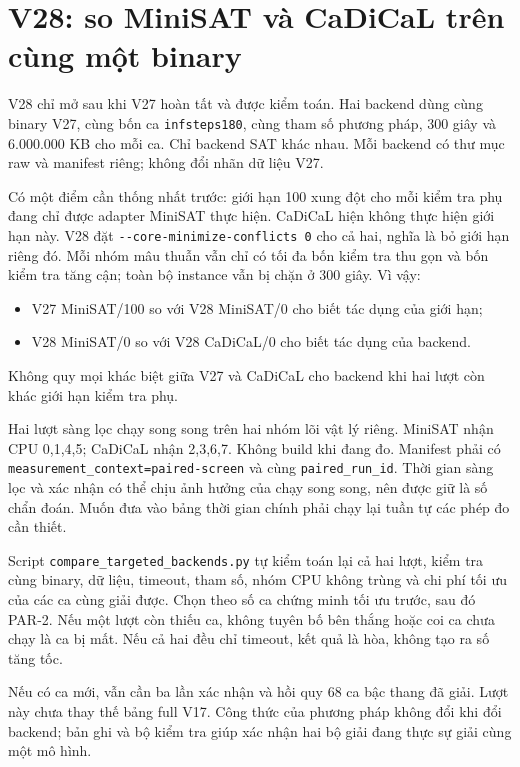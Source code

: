 \documentclass[11pt,a4paper]{article}
\newcommand{\code}[1]{\texttt{#1}}
\newcommand{\file}[1]{\nolinkurl{#1}}
\begin{document}
\section{V28: so MiniSAT và CaDiCaL trên cùng một binary}

V28 chỉ mở sau khi V27 hoàn tất và được kiểm toán. Hai backend dùng
cùng binary V27, cùng bốn ca \code{infsteps180}, cùng tham số phương
pháp, 300 giây và 6.000.000 KB cho mỗi ca. Chỉ backend SAT khác nhau.
Mỗi backend có thư mục raw và manifest riêng; không đổi nhãn dữ liệu V27.

Có một điểm cần thống nhất trước: giới hạn 100 xung đột cho mỗi kiểm tra
phụ đang chỉ được adapter MiniSAT thực hiện. CaDiCaL hiện không thực
hiện giới hạn này. V28 đặt \file{--core-minimize-conflicts 0} cho cả hai,
nghĩa là bỏ giới hạn riêng đó. Mỗi nhóm mâu thuẫn vẫn chỉ có tối đa bốn
kiểm tra thu gọn và bốn kiểm tra tăng cận; toàn bộ instance vẫn bị chặn
ở 300 giây. Vì vậy:
\begin{itemize}
\item V27 MiniSAT/100 so với V28 MiniSAT/0 cho biết tác dụng của giới hạn;
\item V28 MiniSAT/0 so với V28 CaDiCaL/0 cho biết tác dụng của backend.
\end{itemize}
Không quy mọi khác biệt giữa V27 và CaDiCaL cho backend khi hai lượt
còn khác giới hạn kiểm tra phụ.

Hai lượt sàng lọc chạy song song trên hai nhóm lõi vật lý riêng. MiniSAT
nhận CPU 0,1,4,5; CaDiCaL nhận 2,3,6,7. Không build khi đang đo. Manifest
phải có \file{measurement_context=paired-screen} và cùng
\file{paired_run_id}. Thời gian sàng lọc và xác nhận có thể chịu ảnh hưởng
của chạy song song, nên được giữ là số chẩn đoán. Muốn đưa vào bảng thời
gian chính phải chạy lại tuần tự các phép đo cần thiết.

Script \file{compare_targeted_backends.py} tự kiểm toán lại cả hai lượt,
kiểm tra cùng binary, dữ liệu, timeout, tham số, nhóm CPU không trùng
và chi phí tối ưu của các ca cùng giải được. Chọn theo số ca chứng minh
tối ưu trước, sau đó PAR-2. Nếu một lượt còn thiếu ca, không tuyên bố bên
thắng hoặc coi ca chưa chạy là ca bị mất. Nếu cả hai đều chỉ timeout,
kết quả là hòa, không tạo ra số tăng tốc.

Nếu có ca mới, vẫn cần ba lần xác nhận và hồi quy 68 ca bậc thang đã
giải. Lượt này chưa thay thế bảng full V17. Công thức của phương pháp
không đổi khi đổi backend; bản ghi và bộ kiểm tra giúp xác nhận hai
bộ giải đang thực sự giải cùng một mô hình.
\end{document}
